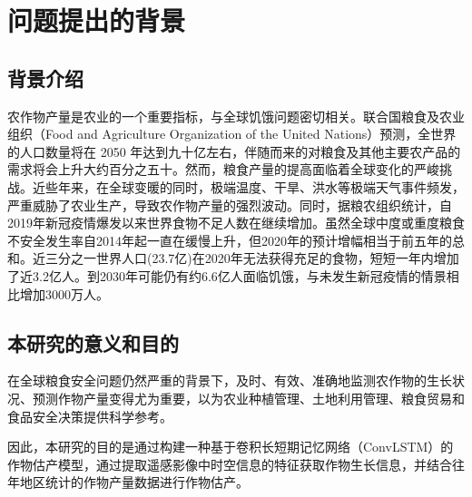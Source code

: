 \section{问题提出的背景}

\subsection{背景介绍}

\par 农作物产量是农业的一个重要指标，与全球饥饿问题密切相关。联合国粮食及农业组织（Food and Agriculture Organization of the United Nations）预测，全世界的人口数量将在 2050 年达到九十亿左右，伴随而来的对粮食及其他主要农产品的需求将会上升大约百分之五十。然而，粮食产量的提高面临着全球变化的严峻挑战。近些年来，在全球变暖的同时，极端温度、干旱、洪水等极端天气事件频发，严重威胁了农业生产，导致农作物产量的强烈波动。同时，据粮农组织统计，自2019年新冠疫情爆发以来世界食物不足人数在继续增加。虽然全球中度或重度粮食不安全发生率自2014年起一直在缓慢上升，但2020年的预计增幅相当于前五年的总和。近三分之一世界人口(23.7亿)在2020年无法获得充足的食物，短短一年内增加了近3.2亿人。到2030年可能仍有约6.6亿人面临饥饿，与未发生新冠疫情的情景相比增加3000万人。

\subsection{本研究的意义和目的}

\par 在全球粮食安全问题仍然严重的背景下，及时、有效、准确地监测农作物的生长状况、预测作物产量变得尤为重要，以为农业种植管理、土地利用管理、粮食贸易和食品安全决策提供科学参考。
\par 因此，本研究的目的是通过构建一种基于卷积长短期记忆网络（ConvLSTM）的作物估产模型，通过提取遥感影像中时空信息的特征获取作物生长信息，并结合往年地区统计的作物产量数据进行作物估产。
